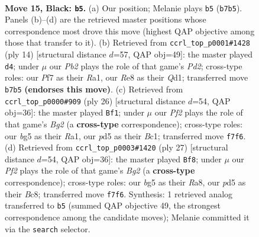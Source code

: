 \documentclass[11pt]{article}
\begin{document}
\clearpage

\begin{figure}[p]\centering
\begin{subfigure}{0.46\textwidth}\centering
\resizebox{\linewidth}{!}{%
\newchessgame
\chessboard[
  setfen={r1b1r1k1/1pqn1pbp/p5p1/2pPp1B1/2B1P3/2P4N/P4PPP/R1Q1K2R b - - 1 15},
  showmover=false,
  pgfstyle=straightmove, color=movearrow, markmove={b7-b5}
]}
\caption{}
\end{subfigure}\hfill
\begin{subfigure}{0.46\textwidth}\centering
\resizebox{\linewidth}{!}{%
\newchessgame
\chessboard[
  setfen={rnbqk2r/1pp2ppp/3p4/p1bPp3/8/P3PN2/1P1P1PPP/R1BQKB1R w KQkq - 1 8},
  showmover=false,
  pgfstyle=straightmove, color=movearrow, markmove={d2-d4}
]}
\caption{}
\end{subfigure}
\\[4pt]
\begin{subfigure}{0.46\textwidth}\centering
\resizebox{\linewidth}{!}{%
\newchessgame
\chessboard[
  setfen={r1bqr1k1/1p3pp1/2pb1n1p/p3p3/P3P3/2P2NP1/1PQ2PBP/R1B1R1K1 w - - 1 14},
  showmover=false,
  pgfstyle=straightmove, color=movearrow, markmove={g2-f1}
]}
\caption{}
\end{subfigure}\hfill
\begin{subfigure}{0.46\textwidth}\centering
\resizebox{\linewidth}{!}{%
\newchessgame
\chessboard[
  setfen={r1b1r1k1/1pq2pbp/2p2np1/p3p3/P3P3/2PB1N1P/1P3PP1/R1BQR1K1 b - - 1 14},
  showmover=false,
  pgfstyle=straightmove, color=movearrow, markmove={g7-f8}
]}
\caption{}
\end{subfigure}
\caption{\textbf{Move 15, Black: \texttt{b5}.} (a) Our position; Melanie plays \texttt{b5} (\texttt{b7b5}). Panels (b)--(d) are the retrieved master positions whose correspondence most drove this move (highest QAP objective among those that transfer to it). (b) Retrieved from \texttt{ccrl\_top\_p0001\#1428} (ply 14) [structural distance $d$=57, QAP obj=49]: the master played \texttt{d4}; under $\mu$ our \emph{Pb2} plays the role of that game's \emph{Pd2}; cross-type roles: our \emph{P}f7 as their \emph{R}a1, our \emph{R}e8 as their \emph{Q}d1; transferred move \texttt{b7b5} \textbf{(endorses this move)}. (c) Retrieved from \texttt{ccrl\_top\_p0000\#909} (ply 26) [structural distance $d$=54, QAP obj=36]: the master played \texttt{Bf1}; under $\mu$ our \emph{Pf2} plays the role of that game's \emph{Bg2} (a \textbf{cross-type} correspondence); cross-type roles: our \emph{b}g5 as their \emph{R}a1, our \emph{p}d5 as their \emph{B}c1; transferred move \texttt{f7f6}. (d) Retrieved from \texttt{ccrl\_top\_p0003\#1420} (ply 27) [structural distance $d$=54, QAP obj=36]: the master played \texttt{Bf8}; under $\mu$ our \emph{Pf2} plays the role of that game's \emph{Bg2} (a \textbf{cross-type} correspondence); cross-type roles: our \emph{b}g5 as their \emph{R}a8, our \emph{p}d5 as their \emph{B}c8; transferred move \texttt{f7f6}. Synthesis: 1 retrieved analog transferred to \texttt{b5} (summed QAP objective 49, the strongest correspondence among the candidate moves); Melanie committed it via the \texttt{search} selector.}
\label{fig:thought-m29}
\end{figure}
\end{document}
